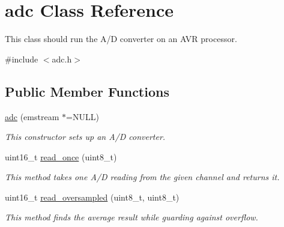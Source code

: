 \hypertarget{classadc}{\section{adc Class Reference}
\label{classadc}
}


This class should run the A/\+D converter on an A\+V\+R processor.  




{\ttfamily \#include $<$adc.\+h$>$}

\subsection*{Public Member Functions}
\begin{DoxyCompactItemize}
\item 
\hyperlink{classadc_af3b8262c08f5fc5ae325a20622883424}{adc} (emstream $\ast$=N\+U\+L\+L)
\begin{DoxyCompactList}\small\item\em This constructor sets up an A/\+D converter. \end{DoxyCompactList}\item 
uint16\+\_\+t \hyperlink{classadc_a2190a59696a7093e1ea605e998ccf97e}{read\+\_\+once} (uint8\+\_\+t)
\begin{DoxyCompactList}\small\item\em This method takes one A/\+D reading from the given channel and returns it. \end{DoxyCompactList}\item 
uint16\+\_\+t \hyperlink{classadc_a58f1030fe64d3dea4ccd8a2687dd6fce}{read\+\_\+oversampled} (uint8\+\_\+t, uint8\+\_\+t)
\begin{DoxyCompactList}\small\item\em This method finds the average result while guarding against overflow. \end{DoxyCompactList}\end{DoxyCompactItemize}

